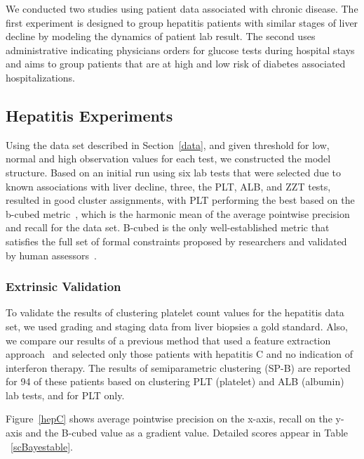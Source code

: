  We conducted two studies using patient data associated with chronic disease.  The first experiment is designed to group hepatitis patients with similar stages of liver decline by modeling the dynamics of patient lab result.  The second uses administrative indicating physicians orders for glucose tests during hospital stays and aims to group patients that are at high and low risk of diabetes associated hospitalizations.


\subsection{Hepatitis Experiments}
Using the data set described in Section~\ref{data}, and given threshold for low, normal and high observation values for each test, we constructed the model structure.  Based on an initial run using six lab tests that were selected due to known associations with liver decline, three, the PLT, ALB, and ZZT tests, resulted in good cluster assignments, with PLT performing the best  based on the b-cubed metric~\cite{Bagga}, which is the harmonic mean of the average pointwise precision and recall for the data set.  B-cubed is the only well-established metric that satisfies the full set of formal constraints proposed by researchers and validated by human assessors~\cite{Amigo}.

\subsubsection{Extrinsic Validation}
To validate the results of clustering platelet count values for the hepatitis data set, we used grading and staging data from liver biopsies a gold standard.  Also, we compare our results of a previous method that used a feature extraction approach~\cite{Hirano07} and selected only those patients with hepatitis C and no indication of interferon therapy.  The results of semiparametric clustering (SP-B) are reported for 94 of these patients based on clustering PLT (platelet) and ALB (albumin) lab tests, and for PLT only.

Figure~\ref{hepC} shows average pointwise precision on the x-axis, recall on the y-axis and the B-cubed value  as a gradient value.  Detailed scores appear in Table ~\ref{scBayestable}.

